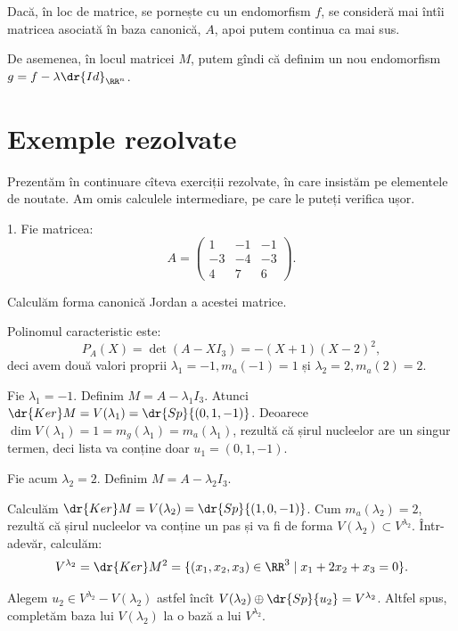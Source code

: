 \begin{remark}\label{rk:jordan-morf}
  Dacă, în loc de matrice, se pornește cu un endomorfism $ f $, se consideră
  mai întîi matricea asociată în baza canonică, $ A $, apoi putem continua
  ca mai sus.

  De asemenea, în locul matricei $ M $, putem gîndi că definim un nou
  endomorfism $ g = f - \lambda \dr{Id}_{\RR^n} $.
\end{remark}

\section{Exemple rezolvate}

Prezentăm în continuare cîteva exerciții rezolvate, în care insistăm
pe elementele de noutate. Am omis calculele intermediare, pe care le
puteți verifica ușor.

1. Fie matricea:
\[
  A = \begin{pmatrix}
    1 & -1 & -1 \\
    -3 & -4 & -3 \\
    4 & 7 & 6
  \end{pmatrix}.
\]

Calculăm forma canonică Jordan a acestei matrice.

Polinomul caracteristic este:
\[
  P_A(X) = \det(A - XI_3) = -(X + 1)(X - 2)^2,
\]
deci avem două valori proprii $ \lambda_1 = -1, m_a(-1) = 1 $ și
$ \lambda_2 = 2, m_a(2) = 2 $.

Fie $ \lambda_1 = -1 $. Definim $ M = A - \lambda_1 I_3 $.
Atunci $ \dr{Ker}M = V(\lambda_1) = \dr{Sp} \{(0, 1, -1)\} $. Deoarece
$ \dim V(\lambda_1) = 1 = m_g(\lambda_1) = m_a(\lambda_1) $, rezultă
că șirul nucleelor are un singur termen, deci lista va conține
doar $ u_1 = (0, 1, -1) $.

Fie acum $ \lambda_2 = 2 $. Definim $ M = A - \lambda_2 I_3 $.

Calculăm $ \dr{Ker}M = V(\lambda_2) = \dr{Sp} \{(1, 0, -1) \} $.
Cum $ m_a(\lambda_2) = 2 $, rezultă că șirul nucleelor va conține un pas și
va fi de forma $ V(\lambda_2) \subset V^{\lambda_2} $. Într-adevăr, calculăm:
\[
  V^{\lambda_2} = \dr{Ker}M^2 = \{ (x_1, x_2, x_3) \in \RR^3 \mid x_1 + 2x_2 + x_3 = 0 \}.
\]

Alegem $ u_2 \in V^{\lambda_2} - V(\lambda_2) $ astfel încît
$ V(\lambda_2) \oplus \dr{Sp} \{ u_2 \} = V^{\lambda_2} $. Altfel spus,
completăm baza lui $ V(\lambda_2) $ la o bază a lui $ V^{\lambda_2} $.

